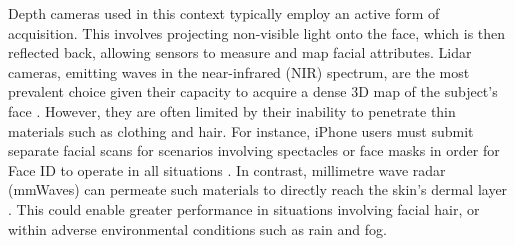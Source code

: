 \documentclass{mpaper}
\begin{document}
Depth cameras used in this context typically employ an active form of acquisition. This involves projecting non-visible light onto the face, which is then reflected back, allowing sensors to measure and map facial attributes. Lidar cameras, emitting waves in the near-infrared (NIR) spectrum, are the most prevalent choice given their capacity to acquire a dense 3D map of the subject's face \cite{wang2020evolution}. However, they are often limited by their inability to penetrate thin materials such as clothing and hair. For instance, iPhone users must submit separate facial scans for scenarios involving spectacles or face masks in order for Face ID to operate in all situations \cite{apple-faceid-mask}. In contrast, millimetre wave radar (mmWaves) can permeate such materials to directly reach the skin's dermal layer \cite{vizard2006advances}. This could enable greater performance in situations involving facial hair, or within adverse environmental conditions such as rain and fog.

\vspace{-2.08pt}
\end{document}
